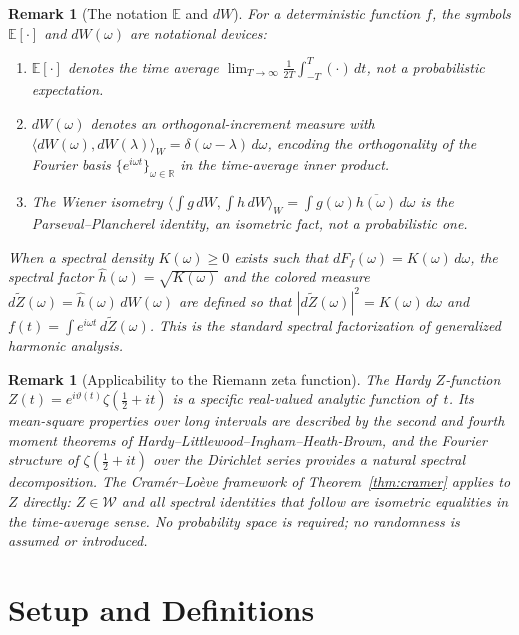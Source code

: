 \documentclass[11pt,a4paper]{article}
\newtheorem{remark}[theorem]{Remark}
\begin{document}
\begin{remark}[The notation $\mathbb{E}$ and $dW$]
\label{rem:notation}
For a deterministic function $f$, the symbols
$\mathbb{E}[\cdot]$ and $dW(\omega)$ are notational devices:
\begin{enumerate}
  \item $\mathbb{E}[\cdot]$ denotes the time average
        $\lim_{T\to\infty}\frac{1}{2T}\int_{-T}^{T}(\cdot)\,dt$,
        not a probabilistic expectation.
  \item $dW(\omega)$ denotes an orthogonal-increment measure with
        $\langle dW(\omega),dW(\lambda)\rangle_W=\delta(\omega-\lambda)\,d\omega$,
        encoding the orthogonality of the Fourier basis
        $\{e^{i\omega t}\}_{\omega\in\mathbb{R}}$
        in the time-average inner product.
  \item The Wiener isometry
        $\langle\int g\,dW,\int h\,dW\rangle_W
         =\int g(\omega)\overline{h(\omega)}\,d\omega$
        is the Parseval--Plancherel identity,
        an isometric fact, not a probabilistic one.
\end{enumerate}
When a spectral density $K(\omega)\ge 0$ exists such that
$dF_f(\omega)=K(\omega)\,d\omega$, the spectral factor
$\hat{h}(\omega)=\sqrt{K(\omega)}$ and the colored measure
$d\widetilde{Z}(\omega)=\hat{h}(\omega)\,dW(\omega)$
are defined so that
$|d\widetilde{Z}(\omega)|^2=K(\omega)\,d\omega$
and $f(t)=\int e^{i\omega t}\,d\widetilde{Z}(\omega)$.
This is the standard spectral factorization of generalized harmonic analysis.
\end{remark}

\begin{remark}[Applicability to the Riemann zeta function]
\label{rem:zeta-applicability}
The Hardy $Z$-function
$Z(t)=e^{i\vartheta(t)}\zeta(\tfrac{1}{2}+it)$
is a specific real-valued analytic function of~$t$. Its mean-square
properties over long intervals are described by the second and fourth
moment theorems of Hardy--Littlewood--Ingham--Heath-Brown, and the
Fourier structure of $\zeta(\tfrac{1}{2}+it)$ over the Dirichlet series
provides a natural spectral decomposition. The Cram\'er--Lo\`eve framework
of Theorem~\ref{thm:cramer} applies to $Z$ directly: $Z\in\mathcal{W}$
and all spectral identities that follow are isometric equalities in the
time-average sense. No probability space is required; no randomness is
assumed or introduced.
\end{remark}


\section{Setup and Definitions}
\end{document}
